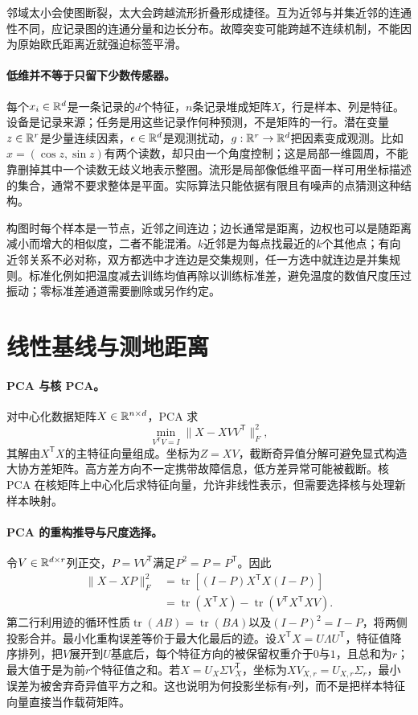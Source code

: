 邻域太小会使图断裂，太大会跨越流形折叠形成捷径。互为近邻与并集近邻的连通性不同，应记录图的连通分量和边长分布。故障突变可能跨越不连续机制，不能因为原始欧氏距离近就强迫标签平滑。

\paragraph{低维并不等于只留下少数传感器。}
每个$x_i\in\mathbb{R}^d$是一条记录的$d$个特征，$n$条记录堆成矩阵$X$，行是样本、列是特征。设备是记录来源；任务是用这些记录作何种预测，不是矩阵的一行。潜在变量$z\in\mathbb{R}^r$是少量连续因素，$\epsilon\in\mathbb{R}^d$是观测扰动，$g:\mathbb{R}^r\to\mathbb{R}^d$把因素变成观测。比如$x=(\cos z,\sin z)$有两个读数，却只由一个角度控制；这是局部一维圆周，不能靠删掉其中一个读数无歧义地表示整圈。流形是局部像低维平面一样可用坐标描述的集合，通常不要求整体是平面。实际算法只能依据有限且有噪声的点猜测这种结构。

构图时每个样本是一节点，近邻之间连边；边长通常是距离，边权也可以是随距离减小而增大的相似度，二者不能混淆。$k$近邻是为每点找最近的$k$个其他点；有向近邻关系不必对称，双方都选中才连边是交集规则，任一方选中就连边是并集规则。标准化例如把温度减去训练均值再除以训练标准差，避免温度的数值尺度压过振动；零标准差通道需要删除或另作约定。

\section{线性基线与测地距离}
\paragraph{PCA 与核 PCA。}
对中心化数据矩阵$X\in\mathbb{R}^{n\times d}$，PCA 求
\begin{equation}
 \min_{V^{\mathsf T}V=I}\|X-XVV^{\mathsf T}\|_F^2,
\end{equation}
其解由$X^{\mathsf T}X$的主特征向量组成。坐标为$Z=XV$，截断奇异值分解可避免显式构造大协方差矩阵。高方差方向不一定携带故障信息，低方差异常可能被截断。核 PCA 在核矩阵上中心化后求特征向量，允许非线性表示，但需要选择核与处理新样本映射\cite{scholkopf1998kpca}。

\paragraph{PCA 的重构推导与尺度选择。}
令$V\in\mathbb{R}^{d\times r}$列正交，$P=VV^{\mathsf T}$满足$P^2=P=P^{\mathsf T}$。因此
\begin{align}
 \|X-XP\|_F^2
 &=\operatorname{tr}[(I-P)X^{\mathsf T}X(I-P)]\\
 &=\operatorname{tr}(X^{\mathsf T}X)-\operatorname{tr}(V^{\mathsf T}X^{\mathsf T}XV).
\end{align}
第二行利用迹的循环性质$\operatorname{tr}(AB)=\operatorname{tr}(BA)$以及$(I-P)^2=I-P$，将两侧投影合并。最小化重构误差等价于最大化最后的迹。设$X^{\mathsf T}X=U\Lambda U^{\mathsf T}$，特征值降序排列，把$V$展开到$U$基底后，每个特征方向的被保留权重介于$0$与$1$，且总和为$r$；最大值于是为前$r$个特征值之和。若$X=U_X\Sigma V_X^{\mathsf T}$，坐标为$XV_{X,r}=U_{X,r}\Sigma_r$，最小误差为被舍弃奇异值平方之和。这也说明为何投影坐标有$r$列，而不是把样本特征向量直接当作载荷矩阵。


